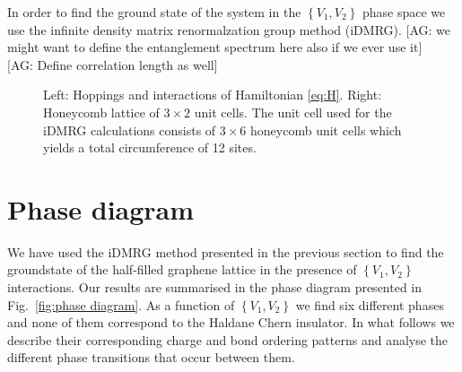 \documentclass[aps,prx,10pt,twocolumn,floatfix,superscriptaddress,showpacs,numerical,footinbib]{revtex4-1}
\newcommand{\noteAG}[1]{{\color{blue} [AG: #1]}}
\begin{document}
In order to find the ground state of the system in the $\left\lbrace V_{1},V_{2}\right\rbrace$ phase space
we use the infinite density matrix renormalzation group method (iDMRG). 
%
\noteAG{we might want to define the entanglement spectrum here also if we ever use it}\\
\noteAG{Define correlation length as well}
%

\begin{figure}
 \caption{Left: Hoppings and interactions of Hamiltonian \eqref{eq:H}. Right: Honeycomb lattice of $3 \times 2$ unit cells. The unit cell used for the iDMRG calculations consists of $3 \times 6$ honeycomb unit cells which yields a total circumference of 12 sites. \label{fig:Defs}}
\end{figure}
%
\section{Phase diagram}
%
We have used the iDMRG method presented in the previous section
to find the groundstate of the half-filled graphene lattice in the presence of 
$\left\lbrace V_{1},V_{2}\right\rbrace$ interactions.
%
Our results are summarised in the phase diagram presented in Fig.~\ref{fig:phase diagram}.
%
As a function of $\left\lbrace V_{1},V_{2}\right\rbrace$ we find six different phases and none of them correspond to the Haldane Chern insulator.
%
In what follows we describe their corresponding charge and bond ordering patterns and analyse the different phase transitions that occur between them.
%
\end{document}

